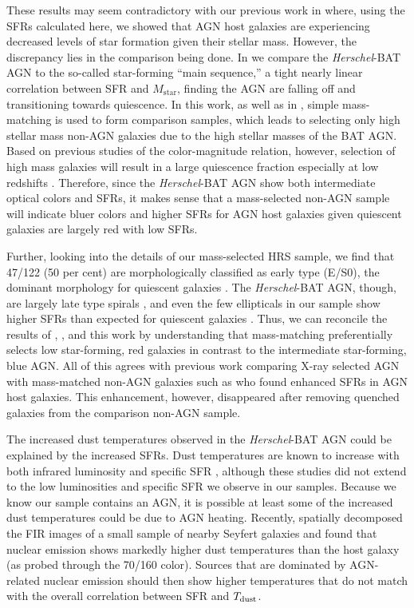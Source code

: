 \documentclass[fleqn, usenatbib]{mnras}
\newcommand{\herschel}{\emph{Herschel}}
\newcommand{\mstar}{$M_{\mathrm{star}}$}
\begin{document}
These results may seem contradictory with our previous work in \citet{Shimizu:2015xo} where, using the SFRs calculated here, we showed that AGN host galaxies are experiencing decreased levels of star formation given their stellar mass. However, the discrepancy lies in the comparison being done. In \citet{Shimizu:2015xo} we compare the \herschel-BAT AGN to the so-called star-forming ``main sequence,'' a tight nearly linear correlation between SFR and \mstar \citep{Brinchmann:2004bf, Salim:2007rm, Noeske:2007fr}, finding the AGN are falling off and transitioning towards quiescence. In this work, as well as in \citet{Koss:2011vn}, simple mass-matching is used to form comparison samples, which leads to selecting only high stellar mass non-AGN galaxies due to the high stellar masses of the BAT AGN. Based on previous studies of the color-magnitude relation, however, selection of high mass galaxies will result in a large quiescence fraction especially at low redshifts  \citep{Kauffmann:2003lr, Wuyts:2011lh, Bell:2012qf}. Therefore, since the \herschel-BAT AGN show both intermediate optical colors and SFRs, it makes sense that a mass-selected non-AGN sample will indicate bluer colors and higher SFRs for AGN host galaxies given quiescent galaxies are largely red with low SFRs.

Further, looking into the details of our mass-selected HRS sample, we find that 47/122 (50 per cent) are morphologically classified as early type (E/S0), the dominant morphology for quiescent galaxies \citep{Wuyts:2011lh, Bell:2012qf}. The \herschel-BAT AGN, though, are largely late type spirals \citep{Koss:2011vn}, and even the few ellipticals in our sample show higher SFRs than expected for quiescent galaxies \citep{Shimizu:2015xo}. Thus, we can reconcile the results of \citet{Koss:2011vn}, \citet{Shimizu:2015xo}, and this work by understanding that mass-matching preferentially selects low star-forming, red galaxies in contrast to the intermediate star-forming, blue AGN. All of this agrees with previous work comparing X-ray selected AGN with mass-matched non-AGN galaxies such as \citet{Santini:2012ly} who found enhanced SFRs in AGN host galaxies. This enhancement, however, disappeared after removing quenched galaxies from the comparison non-AGN sample.  

The increased dust temperatures observed in the \herschel-BAT AGN could be explained by the increased SFRs. Dust temperatures are known to increase with both infrared luminosity and specific SFR \citep[e.g][]{Chapman:2003jk, Symeonidis:2013fe, Cortese:2014qq, Magnelli:2014sf}, although these studies did not extend to the low luminosities and specific SFR we observe in our samples. Because we know our sample contains an AGN, it is possible at least some of the increased dust temperatures could be due to AGN heating. Recently, \citet{Garcio-Gonzalez:2016bk} spatially decomposed the FIR images of a small sample of nearby Seyfert galaxies and found that nuclear emission shows markedly higher dust temperatures than the host galaxy (as probed through the 70/160 \micron{} color). Sources that are dominated by AGN-related nuclear emission should then show higher temperatures that do not match with the overall correlation between SFR and $T_{\rm dust}$. 
\end{document}
